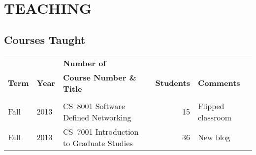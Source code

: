 \section{TEACHING}
\label{sec:teaching}

\subsection{Courses Taught}
\label{subsec:courses}

\begin{center}
\begin{tabular}{lllrl}

& & \textbf{Number of \newline } &\\
\textbf{Term} & {\bf Year} & \textbf{Course Number \& Title} &
\textbf{Students} & \textbf{Comments} \\ \hline \\[\tabitemskip]
Fall & 2013 & CS~8001 Software Defined Networking & 15 & Flipped classroom \\
Fall & 2013 & CS~7001 Introduction to Graduate Studies & 36 & New blog \\



\end{tabular}
\end{center}
